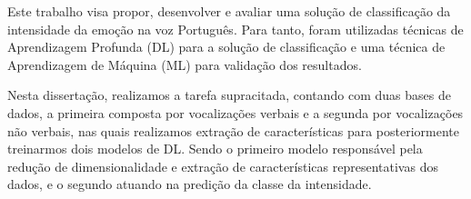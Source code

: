 
Este trabalho visa propor, desenvolver e avaliar uma solução de classificação da intensidade da emoção na voz Português. Para tanto, foram utilizadas técnicas de Aprendizagem Profunda (\acrshort{DL}) para a solução de classificação e uma técnica de Aprendizagem de Máquina (\acrshort{ML}) para validação dos resultados.

Nesta dissertação, realizamos a tarefa supracitada, contando com duas bases de dados, a primeira composta por vocalizações verbais e a segunda por vocalizações não verbais, nas quais realizamos extração de características para posteriormente treinarmos dois modelos de \acrshort{DL}. Sendo o primeiro modelo responsável pela redução de dimensionalidade e extração de características representativas dos dados, e o segundo atuando na predição da classe da intensidade.





